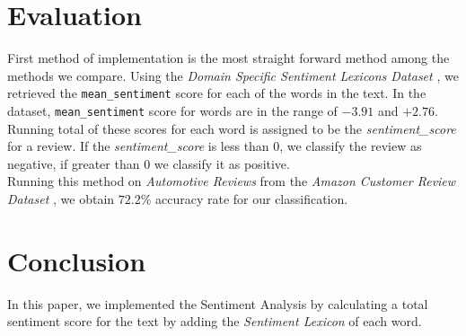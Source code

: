 \documentclass[11pt,a4paper]{article}
\begin{document}
\section{Evaluation}
First method of implementation is the most straight forward method among the methods we compare. Using the \textit{Domain Specific Sentiment Lexicons Dataset} \cite{hamilton2016inducing}, we retrieved the \texttt{mean\_sentiment} score for each of the words in the text. In the dataset, \texttt{mean\_sentiment} score for words are in the range of $-3.91$ and $+2.76$. Running total of these scores for each word is assigned to be the \textit{sentiment\_score} for a review. If the \textit{sentiment\_score} is less than 0, we classify the review as negative, if greater than 0 we classify it as positive. \\

Running this method on \textit{Automotive Reviews} from the \textit{Amazon Customer Review Dataset} \cite{He_2016, mcauley2015imagebased}, we obtain $72.2\%$ accuracy rate for our classification.

\section{Conclusion}
In this paper, we implemented the Sentiment Analysis by calculating a total sentiment score for the text by adding the \textit{Sentiment Lexicon} of each word.



\end{document}
